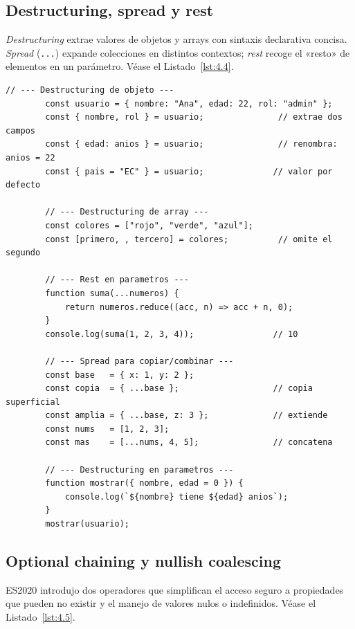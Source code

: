 \documentclass[11pt,a4paper,openany]{book}
\begin{document}
	\subsection{Destructuring, spread y rest}
	\label{sub:4.destructuring}
	
	\emph{Destructuring} extrae valores de objetos y arrays con
	sintaxis declarativa concisa. \emph{Spread} (\texttt{...}) expande
	colecciones en distintos contextos; \emph{rest} recoge el
	«resto» de elementos en un parámetro. Véase el Listado~\ref{lst:4.4}.
	
	\begin{lstlisting}[style=js,caption={Destructuring, spread y rest},label=lst:4.4]
		// --- Destructuring de objeto ---
		const usuario = { nombre: "Ana", edad: 22, rol: "admin" };
		const { nombre, rol } = usuario;               // extrae dos campos
		const { edad: anios } = usuario;               // renombra: anios = 22
		const { pais = "EC" } = usuario;              // valor por defecto
		
		// --- Destructuring de array ---
		const colores = ["rojo", "verde", "azul"];
		const [primero, , tercero] = colores;          // omite el segundo
		
		// --- Rest en parametros ---
		function suma(...numeros) {
			return numeros.reduce((acc, n) => acc + n, 0);
		}
		console.log(suma(1, 2, 3, 4));                // 10
		
		// --- Spread para copiar/combinar ---
		const base   = { x: 1, y: 2 };
		const copia  = { ...base };                   // copia superficial
		const amplia = { ...base, z: 3 };             // extiende
		const nums   = [1, 2, 3];
		const mas    = [...nums, 4, 5];               // concatena
		
		// --- Destructuring en parametros ---
		function mostrar({ nombre, edad = 0 }) {
			console.log(`${nombre} tiene ${edad} anios`);
		}
		mostrar(usuario);
	\end{lstlisting}
	
	\subsection{Optional chaining y nullish coalescing}
	\label{sub:4.optional}
	
	ES2020 introdujo dos operadores que simplifican el acceso seguro
	a propiedades que pueden no existir y el manejo de valores
	nulos o indefinidos. Véase el Listado~\ref{lst:4.5}.
	
\end{document}
